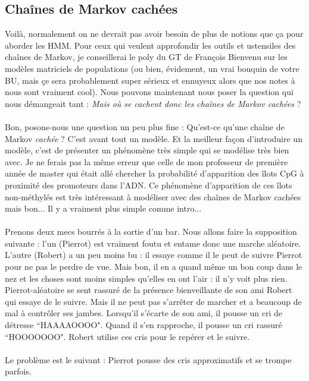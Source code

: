 \documentclass{article}
\begin{document}
\subsection{Cha\^ines de Markov cachées}

Voilà, normalement on ne devrait pas avoir besoin de plus de notions que ça pour aborder les HMM. Pour ceux qui veulent approfondir les outils et ustensiles des cha\^ines de Markov, je conseillerai le poly du GT de François Bienvenu sur les modèles matriciels de populations \cite{5} (ou bien, évidement, un vrai bouquin de votre BU, mais çe sera probablement super sérieux et ennuyeux alors que nos notes à nous sont vraiment cool). Nous pouvons maintenant nous poser la question qui nous démangeait tant : \textit{Mais où se cachent donc les chaînes de Markov cachées} ?\\
\\
Bon, posons-nous une question un peu plus fine : Qu'est-ce qu'une chaîne de Markov \textit{cachée} ? C'est avant tout un modèle. Et la meilleur façon d'introduire un modèle, c'est de présenter un phénomène très simple qui se modélise très bien avec. Je ne ferais pas la même erreur que celle de mon professeur de première année de master qui était allé chercher la probabilité d'apparition des îlots CpG à proximité des promoteurs dans l'ADN. Ce phénomène d'apparition de ces îlots non-méthylés est très intéressant à modéliser avec des chaînes de Markov cachées mais bon... Il y a vraiment plus simple comme intro...\\
\\
Prenons deux mecs bourrés à la sortie d'un bar. Nous allons faire la supposition suivante : l'un (Pierrot) est vraiment foutu et entame donc une marche aléatoire. L'autre (Robert) a un peu moins bu : il essaye comme il le peut de suivre Pierrot pour ne pas le perdre de vue. Mais bon, il en a quand même un bon coup dans le nez et les choses sont moins simples qu'elles en ont l'air : il n'y voit plus rien. Pierrot-aléatoire se sent rassuré de la présence bienveillante de son ami Robert qui essaye de le suivre. Mais il ne peut pas s'arrêter de marcher et a beaucoup de mal à contrôler ses jambes. Lorsqu'il s'écarte de son ami, il pousse un cri de détresse ``HAAAAOOOO". Quand il s'en rapproche, il pousse un cri rassuré ``HOOOOOOO". Robert utilise ces cris pour le repérer et le suivre. \\
\\
Le problème est le suivant : Pierrot pousse des cris approximatifs et se trompe parfois. \\
\end{document}
